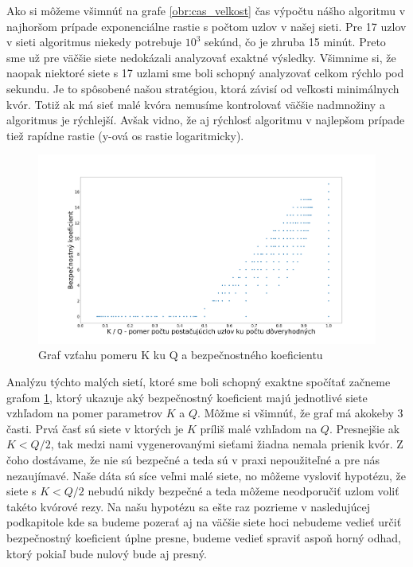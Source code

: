 Ako si môžeme všimnúť na grafe \ref{obr:cas_velkost} čas výpočtu nášho algoritmu
v najhoršom prípade exponenciálne rastie s počtom uzlov v našej sieti. Pre 17 uzlov
v sieti algoritmus niekedy potrebuje $10^3$ sekúnd, čo je zhruba 15 minút. Preto sme
už pre väčšie siete nedokázali analyzovať exaktné výsledky. Všimnime si, že naopak
niektoré siete s 17 uzlami sme boli schopný analyzovať celkom rýchlo pod sekundu.
Je to spôsobené našou stratégiou, ktorá závisí od veľkosti minimálnych kvór. Totiž
ak má sieť malé kvóra nemusíme kontrolovať väčšie nadmnožiny a algoritmus je rýchlejší.
Avšak vidno, že aj rýchlosť algoritmu v najlepšom prípade tiež rapídne rastie
(y-ová os rastie logaritmicky).

\begin{figure}
\centerline{\includegraphics[width=1.2\textwidth]{images/KkuQ_prienik.png}}
\caption{Graf vzťahu pomeru K ku Q a bezpečnostného koeficientu} \label{obr:KkuQ_bezpecnost}
\end{figure}

Analýzu týchto malých sietí, ktoré sme boli schopný exaktne spočítať začneme
grafom \ref{obr:KkuQ_bezpecnost}, ktorý ukazuje aký bezpečnostný
koeficient majú jednotlivé siete vzhľadom na pomer parametrov $K$ a $Q$.
Môžme si všimnúť, že graf má akokeby 3 časti.
Prvá časť sú siete v ktorých je $K$ príliš malé vzhľadom na $Q$. Presnejšie
ak $K < Q/2$, tak medzi nami vygenerovanými sieťami žiadna nemala prienik kvór.
Z čoho dostávame, že nie sú bezpečné a teda sú v praxi nepoužiteľné a pre nás
nezaujímavé. Naše dáta sú síce veľmi malé siete, no môžeme vysloviť hypotézu,
že siete s $K < Q/2$ nebudú nikdy bezpečné a teda môžeme neodporučiť uzlom voliť
takéto kvórové rezy.
Na našu hypotézu sa ešte raz pozrieme v nasledujúcej podkapitole kde sa budeme
pozerať aj na väčšie siete hoci nebudeme vedieť určiť bezpečnostný koeficient
úplne presne, budeme vedieť spraviť aspoň horný odhad, ktorý pokiaľ bude nulový
bude aj presný.

